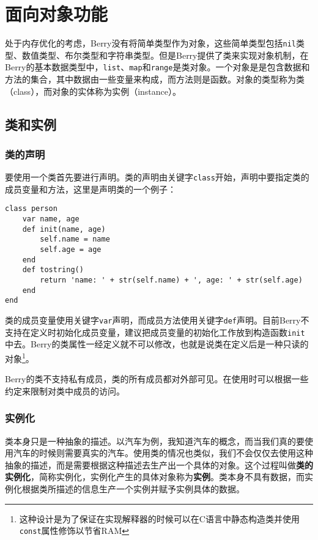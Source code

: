 \chapter{面向对象功能}

处于内存优化的考虑，Berry没有将简单类型作为对象，这些简单类型包括\texttt{nil}类型、数值类型、布尔类型和字符串类型。但是Berry提供了类来实现对象机制，在Berry的基本数据类型中，\texttt{list}、\texttt{map}和\texttt{range}是类对象。一个对象是是包含数据和方法的集合，其中数据由一些变量来构成，而方法则是函数。对象的类型称为类（class），而对象的实体称为实例（instance）。

\section{类和实例}

\subsection{类的声明}

要使用一个类首先要进行声明。类的声明由关键字\texttt{class}开始，声明中要指定类的成员变量和方法，这里是声明类的一个例子：
\begin{lstlisting}[language=berry, numbers=none]
class person
    var name, age
    def init(name, age)
        self.name = name
        self.age = age
    end
    def tostring()
        return 'name: ' + str(self.name) + ', age: ' + str(self.age)
    end
end
\end{lstlisting}

类的成员变量使用关键字\texttt{var}声明，而成员方法使用关键字\texttt{def}声明。目前Berry不支持在定义时初始化成员变量，建议把成员变量的初始化工作放到构造函数\texttt{init}中去。Berry的类属性一经定义就不可以修改，也就是说类在定义后是一种只读的对象\footnote{这种设计是为了保证在实现解释器的时候可以在C语言中静态构造类并使用\texttt{const}属性修饰以节省RAM}。

Berry的类不支持私有成员，类的所有成员都对外部可见。在使用时可以根据一些约定来限制对类中成员的访问。

\subsection{实例化}

类本身只是一种抽象的描述。以汽车为例，我知道汽车的概念，而当我们真的要使用汽车的时候则需要真实的汽车。使用类的情况也类似，我们不会仅仅去使用这种抽象的描述，而是需要根据这种描述去生产出一个具体的对象。这个过程叫做\textbf{类的实例化}，简称实例化，实例化产生的具体对象称为\textbf{实例}。类本身不具有数据，而实例化根据类所描述的信息生产一个实例并赋予实例具体的数据。

